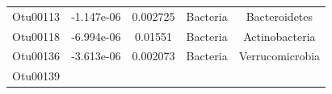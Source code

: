 \documentclass[]{article}
\begin{document}
\begin{longtable}[]{@{}ccccc@{}}
\begin{minipage}[t]{0.13\columnwidth}
Otu00113\strut
\end{minipage} & \begin{minipage}[t]{0.16\columnwidth}\centering\strut
-1.147e-06\strut
\end{minipage} & \begin{minipage}[t]{0.14\columnwidth}\centering\strut
0.002725\strut
\end{minipage} & \begin{minipage}[t]{0.13\columnwidth}\centering\strut
Bacteria\strut
\end{minipage} & \begin{minipage}[t]{0.27\columnwidth}\centering\strut
Bacteroidetes\strut
\end{minipage}\tabularnewline
\begin{minipage}[t]{0.13\columnwidth}\centering\strut
Otu00118\strut
\end{minipage} & \begin{minipage}[t]{0.16\columnwidth}\centering\strut
-6.994e-06\strut
\end{minipage} & \begin{minipage}[t]{0.14\columnwidth}\centering\strut
0.01551\strut
\end{minipage} & \begin{minipage}[t]{0.13\columnwidth}\centering\strut
Bacteria\strut
\end{minipage} & \begin{minipage}[t]{0.27\columnwidth}\centering\strut
Actinobacteria\strut
\end{minipage}\tabularnewline
\begin{minipage}[t]{0.13\columnwidth}\centering\strut
Otu00136\strut
\end{minipage} & \begin{minipage}[t]{0.16\columnwidth}\centering\strut
-3.613e-06\strut
\end{minipage} & \begin{minipage}[t]{0.14\columnwidth}\centering\strut
0.002073\strut
\end{minipage} & \begin{minipage}[t]{0.13\columnwidth}\centering\strut
Bacteria\strut
\end{minipage} & \begin{minipage}[t]{0.27\columnwidth}\centering\strut
Verrucomicrobia\strut
\end{minipage}\tabularnewline
\begin{minipage}[t]{0.13\columnwidth}\centering\strut
Otu00139\strut
\end{minipage} & \begin{minipage}[t]{0.16\columnwidth}\centering\strut

\end{minipage}
\end{longtable}
\end{document}

